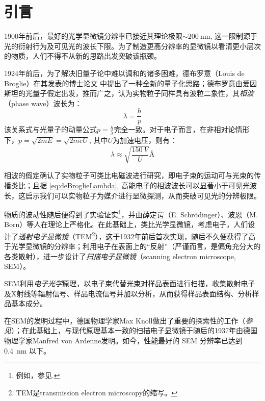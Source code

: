 \documentclass[a4paper]{article}
\begin{document}
\section{引言}\label{overview}%

1900年前后，最好的光学显微镜分辨率已接近其理论极限$\sim\SI{200}{\nm}$, 这一限制源于光的衍射行为及可见光的波长下限。为了制造更高分辨率的显微镜以看清更小层次的物质，人们不得不从新的思路出发突破该瓶颈。
	

1924年前后，为了解决旧量子论中难以调和的诸多困难，德布罗意（Louis de Broglie）在其发表的博士论文 \cite{de1924recherches} 中提出了一种全新的量子化思路；德布罗意由爱因斯坦的光量子假定出发，推而广之，认为实物粒子同样具有波粒二象性，其\textit{相波}（phase wave）波长为：
\begin{equation}
	\lambda = \frac{h}{p}
\end{equation}
该关系式与光量子的动量公式$p = \frac{h}{\lambda}$完全一致。对于电子而言，在非相对论情形下，$p = \sqrt{2mE} = \sqrt{2meU}$, 其中$U$为加速电压，则有：
\begin{equation}
    \lambda \approx \sqrt{\frac{\SI{150}{V}}{U}}\si{\angstrom}
\end{equation}\label{eq:deBroglieLambda}
	
相波的假定确认了实物粒子可类比电磁波进行研究，即电子束的运动可与光束的传播类比；且据 \eqref{eq:deBroglieLambda}, 高能电子的相波波长可以显著小于可见光波长，这启示我们可以实物粒子为媒介进行显微探测，从而突破可见光的分辨极限。
	
物质的波动性随后便得到了实验证实\footnote{例如，参见\cite{thomson1927diffraction}. }，并由薛定谔（E. Schrödinger）、波恩（M. Born）等人在理论上严格化。在此基础上，类比光学显微镜，考虑电子，人们设计了\textit{透射电子显微镜}（TEM\footnote{TEM是transmission electron microscopy的缩写。}），这于1932年前后首次实现，随后不久便获得了高于光学显微镜的分辨率\cite{ruska1980early}；利用电子在表面上的“反射”（严谨而言，是偏角充分大的各类散射），进一步设计了\textit{扫描电子显微镜}（scanning electron microscope, SEM）。
	
SEM利用\textit{电子光学}原理，以电子束代替光束对样品表面进行扫描，收集散射电子及X射线等辐射信号、样品电流信号并加以分析，从而获得样品表面结构、分析样品基本成分。
	
在SEM的发明过程中，德国物理学家Max Knoll做出了重要的探索性的工作（\textit{参见\cite{knoll1935aufladepotentiel}}）；在此基础上，与现代原理基本一致的扫描电子显微镜于随后的1937年由德国物理学家Manfred von Ardenne发明\cite{mcmullan1995scanning}。如今，性能最好的 SEM 分辨率已达到 \SI{.4}{\nm} 以下\supercite{Nanotech86:online}。
	
\end{document}
